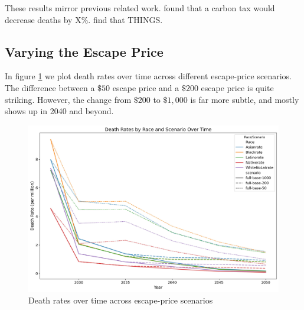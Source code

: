 \documentclass[a4paper]{article}
\theoremstyle{definition}
\theoremstyle{plain}
\begin{document}
These results mirror previous related work.  \citet{Shawhan2024PoliciesAmericans} found that a carbon tax would decrease deaths by X$\%$.  \citet{Goforth2022AirStrategies} find that THINGS.

\subsection{Varying the Escape Price}
In figure \ref{EscapePrice} we plot death rates over time across different escape-price scenarios.  The difference between a $\$50$ escape price and a $\$200$ escape price is quite striking.  However, the change from $\$200$ to $\$1,000$ is far more subtle, and mostly shows up in 2040 and beyond.

\begin{figure}
    \centering
    \includegraphics[width=1\linewidth]{Figures/Output/Compare_scenarios_compare-escape-price_GenX.jpg}
    \caption{Death rates over time across escape-price scenarios}
    \label{EscapePrice}
\end{figure}
\end{document}
